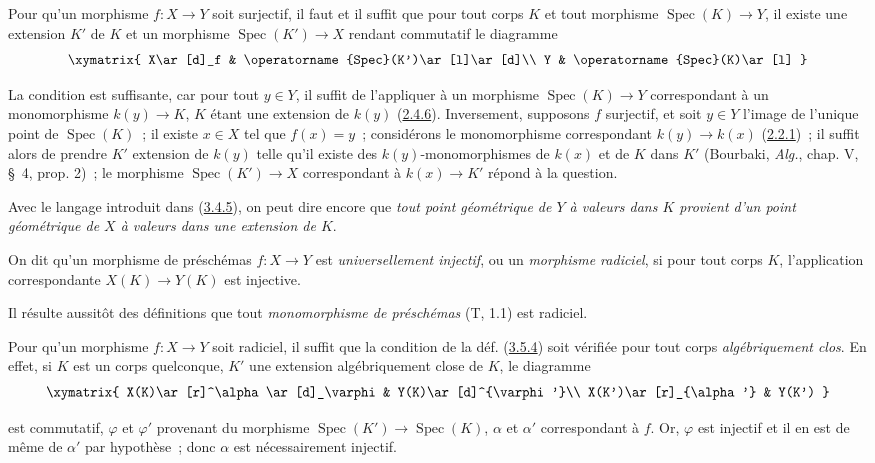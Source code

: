 \begin{proposition}[3.5.3]
\label{I.3.5.3-fr}
Pour qu'un morphisme $f:X\to Y$ soit surjectif, il faut et il suffit que pour
tout corps $K$ et tout morphisme $\operatorname{Spec}(K)\to Y$, il existe une
extension $K'$ de $K$ et un morphisme $\operatorname{Spec}(K')\to X$ rendant
commutatif le diagramme
\label{I.3.5.3.surjectivity-diagram-fr}
\[
  \xymatrix{
    X\ar[d]_f & \operatorname{Spec}(K')\ar[l]\ar[d]\\
    Y & \operatorname{Spec}(K)\ar[l]
  }
\]
\end{proposition}

La condition est suffisante, car pour tout $y\in Y$, il suffit de l'appliquer
à un morphisme $\operatorname{Spec}(K)\to Y$ correspondant à un monomorphisme
$k(y)\to K$, $K$ étant une extension de $k(y)$
(\hyperref[I.2.4.6-fr]{2.4.6}). Inversement, supposons $f$ surjectif, et soit
$y\in Y$ l'image de l'unique point de $\operatorname{Spec}(K)$~; il existe
$x\in X$ tel que $f(x)=y$~; considérons le monomorphisme correspondant
$k(y)\to k(x)$ (\hyperref[I.2.2.1-fr]{2.2.1})~; il suffit alors de prendre
$K'$ extension de $k(y)$ telle qu'il existe des $k(y)$-monomorphismes de
$k(x)$ et de $K$ dans $K'$ (Bourbaki, \emph{Alg.}, chap. V, \S~4, prop. 2)~;
le morphisme $\operatorname{Spec}(K')\to X$ correspondant à $k(x)\to K'$
répond à la question.

Avec le langage introduit dans (\hyperref[I.3.4.5-fr]{3.4.5}), on peut dire
encore que \emph{tout point géométrique de $Y$ à valeurs dans $K$ provient
d'un point géométrique de $X$ à valeurs dans une extension de $K$}.

\begin{definition}[3.5.4]
\label{I.3.5.4-fr}
On dit qu'un morphisme de préschémas $f:X\to Y$ est \emph{universellement
injectif}, ou un \emph{morphisme radiciel}, si pour tout corps $K$,
l'application correspondante $X(K)\to Y(K)$ est injective.
\end{definition}

Il résulte aussitôt des définitions que tout \emph{monomorphisme de
préschémas} (T, 1.1) est radiciel.

\begin{env}[3.5.5]
\label{I.3.5.5-fr}
Pour qu'un morphisme $f:X\to Y$ soit radiciel, il suffit que la condition de
la déf. (\hyperref[I.3.5.4-fr]{3.5.4}) soit vérifiée pour tout corps
\emph{algébriquement clos}. En effet, si $K$ est un corps quelconque, $K'$ une
extension algébriquement close de $K$, le diagramme
\label{I.3.5.5.algebraic-closure-diagram-fr}
\[
  \xymatrix{
    X(K)\ar[r]^\alpha\ar[d]_\varphi & Y(K)\ar[d]^{\varphi'}\\
    X(K')\ar[r]_{\alpha'} & Y(K')
  }
\]

est commutatif, $\varphi$ et $\varphi'$ provenant du morphisme
$\operatorname{Spec}(K')\to\operatorname{Spec}(K)$, $\alpha$ et $\alpha'$
correspondant à $f$. Or, $\varphi$ est injectif et il en est de même de
$\alpha'$ par hypothèse~; donc $\alpha$ est nécessairement injectif.
\end{env}

